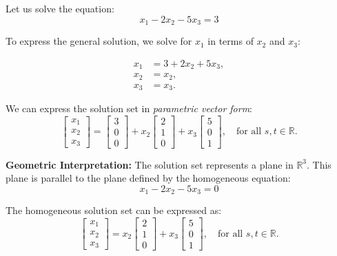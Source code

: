 \begin{solution}
        Let us solve the equation:
        \[
        x_1 - 2 x_2 - 5 x_3 = 3
        \]
        
        To express the general solution, we solve for \( x_1 \) in terms of \( x_2 \) and \( x_3 \):
    
        \[
        \begin{aligned}
        x_1 &= 3 + 2x_2 + 5x_3, \\
        x_2 &= x_2, \\
        x_3 &= x_3.
        \end{aligned}
        \]
        
        We can express the solution set in \textit{parametric vector form}:
        \[
        \begin{bmatrix}
        x_1 \\
        x_2 \\
        x_3
        \end{bmatrix}
        =
        \begin{bmatrix}
        3 \\
        0 \\
        0
        \end{bmatrix}
        +
        x_2
        \begin{bmatrix}
        2 \\
        1 \\
        0
        \end{bmatrix}
        +
        x_3
        \begin{bmatrix}
        5 \\
        0 \\
        1
        \end{bmatrix}, \quad \text{for all } s, t \in \mathbb{R}.
        \]
        
        \textbf{Geometric Interpretation:} The solution set represents a plane in \(\mathbb{R}^3\). This plane is parallel to the plane defined by the homogeneous equation:
        \[
        x_1 - 2 x_2 - 5 x_3 = 0
        \]
        
        The homogeneous solution set can be expressed as:
        \[
        \begin{bmatrix}
        x_1 \\
        x_2 \\
        x_3
        \end{bmatrix}
        =
        x_2
        \begin{bmatrix}
        2 \\
        1 \\
        0
        \end{bmatrix}
        +
        x_3
        \begin{bmatrix}
        5 \\
        0 \\
        1
        \end{bmatrix}, \quad \text{for all } s, t \in \mathbb{R}.
        \]
        

\end{solution}
